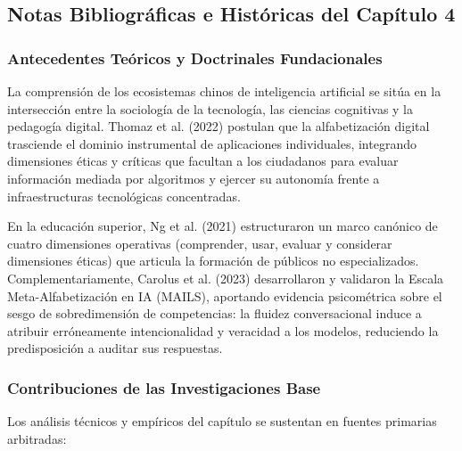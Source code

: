 \newpage
{}

\subsection*{Notas Bibliográficas e Históricas del Capítulo 4}

\subsubsection*{Antecedentes Teóricos y Doctrinales Fundacionales}

La comprensión de los ecosistemas chinos de inteligencia artificial se sitúa en la intersección entre la sociología de la tecnología, las ciencias cognitivas y la pedagogía digital. Thomaz et al. (2022) postulan que la alfabetización digital trasciende el dominio instrumental de aplicaciones individuales, integrando dimensiones éticas y críticas que facultan a los ciudadanos para evaluar información mediada por algoritmos y ejercer su autonomía frente a infraestructuras tecnológicas concentradas.

En la educación superior, Ng et al. (2021) estructuraron un marco canónico de cuatro dimensiones operativas (comprender, usar, evaluar y considerar dimensiones éticas) que articula la formación de públicos no especializados. Complementariamente, Carolus et al. (2023) desarrollaron y validaron la Escala Meta-Alfabetización en IA (MAILS), aportando evidencia psicométrica sobre el sesgo de sobredimensión de competencias: la fluidez conversacional induce a atribuir erróneamente intencionalidad y veracidad a los modelos, reduciendo la predisposición a auditar sus respuestas.

\subsubsection*{Contribuciones de las Investigaciones Base}

Los análisis técnicos y empíricos del capítulo se sustentan en fuentes primarias arbitradas:

